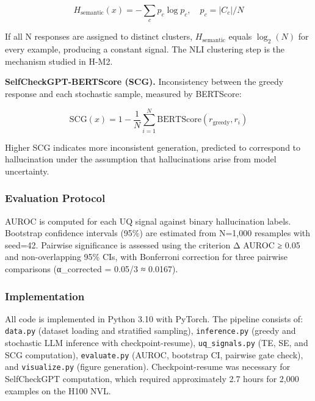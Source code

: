 $$H_\text{semantic}(x) = -\sum_c p_c \log p_c, \quad p_c = |C_c| / N$$

If all N responses are assigned to distinct clusters, $H_\text{semantic}$ equals $\log_2(N)$ for every example, producing a constant signal. The NLI clustering step is the mechanism studied in H-M2.

\textbf{SelfCheckGPT-BERTScore (SCG).} Inconsistency between the greedy response and each stochastic sample, measured by BERTScore:

$$\text{SCG}(x) = 1 - \frac{1}{N} \sum_{i=1}^{N} \text{BERTScore}(r_\text{greedy}, r_i)$$

Higher SCG indicates more inconsistent generation, predicted to correspond to hallucination under the assumption that hallucinations arise from model uncertainty.

\subsubsection{Evaluation Protocol}

AUROC is computed for each UQ signal against binary hallucination labels. Bootstrap confidence intervals (95\%) are estimated from N=1,000 resamples with seed=42. Pairwise significance is assessed using the criterion Δ AUROC ≥ 0.05 and non-overlapping 95\% CIs, with Bonferroni correction for three pairwise comparisons (α_corrected = 0.05/3 ≈ 0.0167).

\subsubsection{Implementation}

All code is implemented in Python 3.10 with PyTorch. The pipeline consists of: \texttt{data.py} (dataset loading and stratified sampling), \texttt{inference.py} (greedy and stochastic LLM inference with checkpoint-resume), \texttt{uq_signals.py} (TE, SE, and SCG computation), \texttt{evaluate.py} (AUROC, bootstrap CI, pairwise gate check), and \texttt{visualize.py} (figure generation). Checkpoint-resume was necessary for SelfCheckGPT computation, which required approximately 2.7 hours for 2,000 examples on the H100 NVL.

